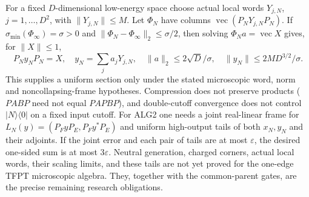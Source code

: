 For a fixed $D$-dimensional low-energy space choose actual local words
$Y_{j,N}$, $j=1,\ldots,D^2$, with $\|Y_{j,N}\|\le M$.
Let $\Phi_N$ have columns $\operatorname{vec}(P_NY_{j,N}P_N)$.
If $\sigma_{\min}(\Phi_\infty)=\sigma>0$ and
$\|\Phi_N-\Phi_\infty\|_2\le\sigma/2$, then solving
$\Phi_Na=\operatorname{vec}X$ gives, for $\|X\|\le1$,
\[
 P_Ny_NP_N=X,\quad y_N=\sum_ja_jY_{j,N},\quad
 \|a\|_2\le2\sqrt D/\sigma,\quad
 \|y_N\|\le2MD^{3/2}/\sigma.
\]
This supplies a uniform section only under the stated microscopic word,
norm and noncollapsing-frame hypotheses. Compression does not preserve
products ($PABP$ need not equal $PAPBP$), and double-cutoff convergence
does not control $|N\rangle\langle0|$ on a fixed input cutoff.
For ALG2 one needs a joint real-linear frame for
$L_N(y)=(P_FyP_E,P_Fy^*P_E)$ and uniform high-output tails of both
$x_N,y_N$ and their adjoints. If the joint error and each pair of tails
are at most $\varepsilon$, the desired one-sided sum is at most
$3\varepsilon$. Neutral generation, charged corners, actual local words,
their scaling limits, and these tails are not yet proved for the one-edge
TFPT microscopic algebra. They, together with the common-parent gates,
are the precise remaining research obligations.
